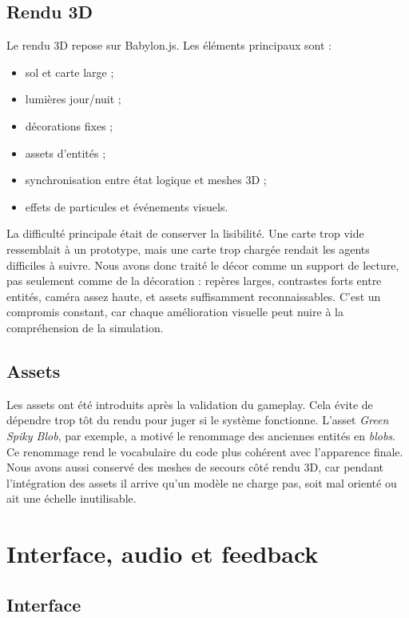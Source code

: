 ﻿\documentclass[11pt,a4paper]{article}
\begin{document}
\subsection{Rendu 3D}

Le rendu 3D repose sur Babylon.js. Les éléments principaux sont :

\begin{itemize}[noitemsep]
  \item sol et carte large ;
  \item lumières jour/nuit ;
  \item décorations fixes ;
  \item assets d'entités ;
  \item synchronisation entre état logique et meshes 3D ;
  \item effets de particules et événements visuels.
\end{itemize}

La difficulté principale était de conserver la lisibilité. Une carte trop vide ressemblait à un prototype, mais une carte trop chargée rendait les agents difficiles à suivre. Nous avons donc traité le décor comme un support de lecture, pas seulement comme de la décoration : repères larges, contrastes forts entre entités, caméra assez haute, et assets suffisamment reconnaissables. C'est un compromis constant, car chaque amélioration visuelle peut nuire à la compréhension de la simulation.

\subsection{Assets}

Les assets ont été introduits après la validation du gameplay. Cela évite de dépendre trop tôt du rendu pour juger si le système fonctionne. L'asset \emph{Green Spiky Blob}, par exemple, a motivé le renommage des anciennes entités en \emph{blobs}. Ce renommage rend le vocabulaire du code plus cohérent avec l'apparence finale. Nous avons aussi conservé des meshes de secours côté rendu 3D, car pendant l'intégration des assets il arrive qu'un modèle ne charge pas, soit mal orienté ou ait une échelle inutilisable.

\section{Interface, audio et feedback}

\subsection{Interface}
\end{document}
